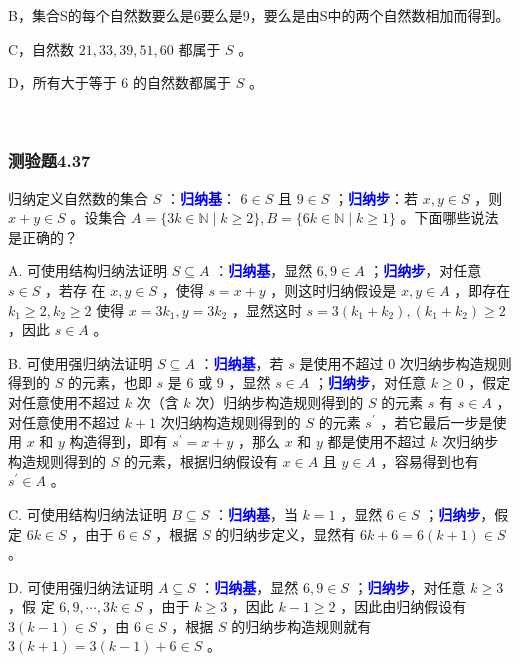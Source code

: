 \documentclass[UTF8, heading=true]{ctexart}
\begin{document}
B，集合S的每个自然数要么是6要么是9，要么是由S中的两个自然数相加而得到。

C，自然数 $21,33,39,51,60$ 都属于 $S$ 。

D，所有大于等于 6 的自然数都属于 $S$ 。

\textcolor{white}{答案：BC}


\subsubsection{测验题4.37}

归纳定义自然数的集合 $S$ ：\textcolor{blue}{\textbf{归纳基}}： $6 \in S$ 且 $9 \in S$ ；\textcolor{blue}{\textbf{归纳步}}：若 $x, y \in S$ ，则 $x+y \in S$ 。设集合 $A=\{3 k \in \mathbb{N} \mid k \geq 2\}, B=\{6 k \in \mathbb{N} \mid k \geq 1\}$ 。下面哪些说法是正确的？

A. 可使用结构归纳法证明 $S \subseteq A$ ：\textcolor{blue}{\textbf{归纳基}}，显然 $6,9 \in A$ ；\textcolor{blue}{\textbf{归纳步}}，对任意 $s \in S$ ，若存
在 $x, y \in S$ ，使得 $s=x+y$ ，则这时归纳假设是 $x, y \in A$ ，即存在 $k_1 \geq 2, k_2 \geq 2$ 使得 $x=3 k_1, y=3 k_2$ ，显然这时 $s=3\left(k_1+k_2\right),\left(k_1+k_2\right) \geq 2$ ，因此 $s \in A$ 。

B. 可使用强归纳法证明 $S \subseteq A$ ：\textcolor{blue}{\textbf{归纳基}}，若 $s$ 是使用不超过 0 次归纳步构造规则得到的 $S$ 的元素，也即 $s$ 是 6 或 9 ，显然 $s \in A$ ；\textcolor{blue}{\textbf{归纳步}}，对任意 $k \geq 0$ ，假定对任意使用不超过 $k$ 次（含 $k$ 次）归纳步构造规则得到的 $S$ 的元素 $s$ 有 $s \in A$ ，对任意使用不超过 $k+1$ 次归纳构造规则得到的 $S$ 的元素 $s^{\prime}$ ，若它最后一步是使用 $x$ 和 $y$ 构造得到，即有 $s^{\prime}=x+y$ ，那么 $x$ 和 $y$ 都是使用不超过 $k$ 次归纳步构造规则得到的 $S$ 的元素，根据归纳假设有 $x \in A$ 且 $y \in A$ ，容易得到也有 $s^{\prime} \in A$ 。

C. 可使用结构归纳法证明 $B \subseteq S$ ：\textcolor{blue}{\textbf{归纳基}}，当 $k=1$ ，显然 $6 \in S$ ；\textcolor{blue}{\textbf{归纳步}}，假定 $6 k \in S$ ，由于 $6 \in S$ ，根据 $S$ 的归纳步定义，显然有 $6 k+6=6(k+1) \in S$ 。

D.  可使用强归纳法证明 $A \subseteq S$ ：\textcolor{blue}{\textbf{归纳基}}，显然 $6,9 \in S$ ；\textcolor{blue}{\textbf{归纳步}}，对任意 $k \geq 3$ ，假
定 $6,9, \cdots, 3 k \in S$ ，由于 $k \geq 3$ ，因此 $k-1 \geq 2$ ，因此由归纳假设有 $3(k-1) \in S$ ，由 $6 \in S$ ，根据 $S$ 的归纳步构造规则就有 $3(k+1)=3(k-1)+6 \in S$ 。
\end{document}
